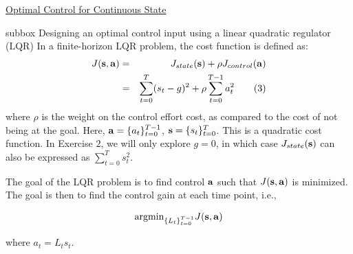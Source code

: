 \begin{textbox}{\href{https://compneuro.neuromatch.io/tutorials/W3D3_OptimalControl/student/W3D3_Tutorial2.html}{Optimal Control for Continuous State}}
\begin{subbox}{subbox}{ Designing an optimal control input using a linear quadratic regulator (LQR)}
In a finite-horizon LQR problem,  the cost function is defined as: 
\begin{eqnarray*}
J({\bf s},{\bf a}) &=& J_{state}({\bf s}) + \rho J_{control}({\bf a}) \\
 &=& \sum_{t = 0}^{T} (s_{t}-g)^2 + \rho \sum_{t=0}^{T-1}a_{t}^2 \tag{3}
\end{eqnarray*}
where $\rho$ is the weight on the control effort cost, as compared to the cost of not being at the goal. Here, ${\bf a} = \{a_t\}_{t=0}^{T-1}$, ${\bf s} = \{s_t\}_{t=0}^{T}$. This is a quadratic cost function. In Exercise $2$, we will only explore $g=0$, in which case $J_{state}({\bf s})$ can also be expressed as $\sum_{t = 0}^{T} s_{t}^2$. 


The goal of the LQR problem is to find control ${\bf a}$ such that $J({\bf s},{\bf a})$ is minimized. The goal is then to find the control gain at each time point, i.e.,

\begin{equation*}
\text{argmin} _{\{L_t\}_{t=0}^{T-1}}  J({\bf s},{\bf a}) 
\end{equation*}

where $a_t = L_t s_t$.


\end{subbox}


\end{textbox}
